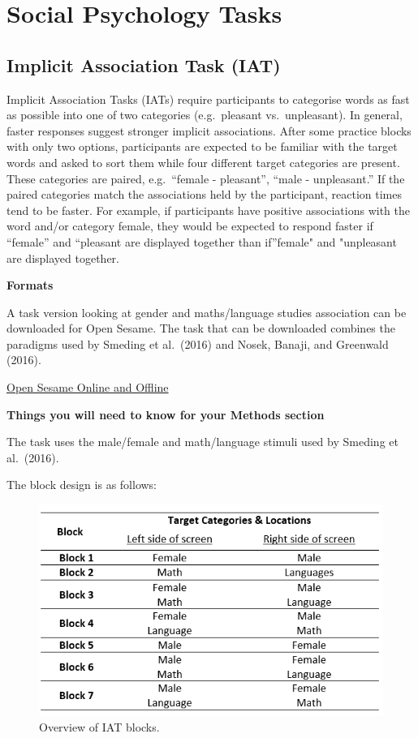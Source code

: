 \documentclass[
]{book}
\begin{document}
\hypertarget{social-psychology-tasks}{%
\chapter{Social Psychology Tasks}\label{social-psychology-tasks}}

\hypertarget{implicit-association-task-iat}{%
\section{Implicit Association Task (IAT)}\label{implicit-association-task-iat}}

Implicit Association Tasks (IATs) require participants to categorise words as fast as possible into one of two categories (e.g.~pleasant vs.~unpleasant). In general, faster responses suggest stronger implicit associations. After some practice blocks with only two options, participants are expected to be familiar with the target words and asked to sort them while four different target categories are present. These categories are paired, e.g.~``female - pleasant'', ``male - unpleasant.'' If the paired categories match the associations held by the participant, reaction times tend to be faster. For example, if participants have positive associations with the word and/or category female, they would be expected to respond faster if ``female'' and ``pleasant are displayed together than if''female" and "unpleasant are displayed together.

\textbf{Formats}

A task version looking at gender and maths/language studies association can be downloaded for Open Sesame. The task that can be downloaded combines the paradigms used by Smeding et al.~(2016) and Nosek, Banaji, and Greenwald (2016).

\href{link\%20here}{Open Sesame Online and Offline}

\textbf{Things you will need to know for your Methods section}

The task uses the male/female and math/language stimuli used by Smeding et al.~(2016).

The block design is as follows:

\begin{figure}

{\centering \includegraphics[width=0.75\linewidth]{images/IAT_Design} 

}

\caption{Overview of IAT blocks.}\label{fig:Figure6-1}
\end{figure}
\end{document}
